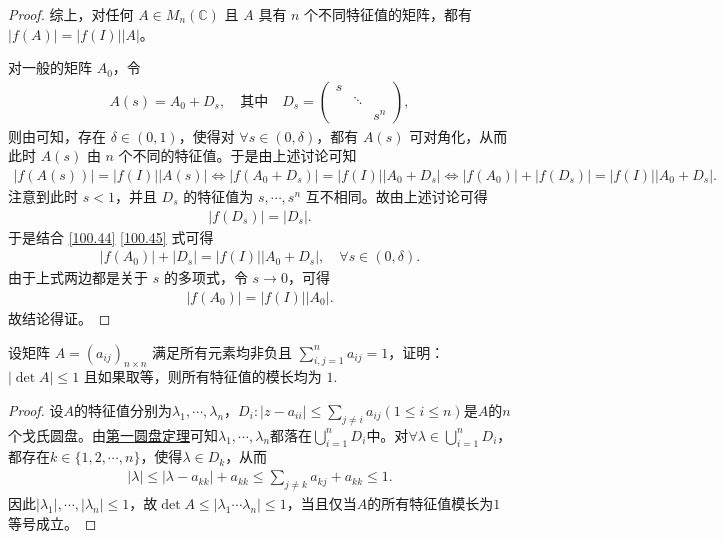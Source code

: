 \documentclass[../../main.tex]{subfiles}%
\begin{document}
\begin{proof}
综上，对任何 $A \in M_n(\mathbb{C})$ 且 $A$ 具有 $n$ 个不同特征值的矩阵，都有 $|f(A)| = |f(I)| |A|$。

对一般的矩阵 $A_0$，令
\begin{align*}
A(s) = A_0 + D_s, \quad \text{其中} \quad D_s = \begin{pmatrix}
s & & \\
& \ddots & \\
& & s^n
\end{pmatrix},
\end{align*}
则由可知，存在 $\delta \in (0, 1)$，使得对 $\forall s \in (0, \delta)$，都有 $A(s)$ 可对角化，从而此时 $A(s)$ 由 $n$ 个不同的特征值。于是由上述讨论可知
\begin{align}
|f(A(s))| = |f(I)| |A(s)| \Longleftrightarrow |f(A_0 + D_s)| = |f(I)| |A_0 + D_s| \Longleftrightarrow |f(A_0)| + |f(D_s)| = |f(I)| |A_0 + D_s|. \label{100.44}
\end{align}
注意到此时 $s < 1$，并且 $D_s$ 的特征值为 $s, \cdots, s^n$ 互不相同。故由上述讨论可得
\begin{align}
|f(D_s)| = |D_s|. \label{100.45}
\end{align}
于是结合 \eqref{100.44} \eqref{100.45} 式可得
\begin{align*}
|f(A_0)| + |D_s| = |f(I)| |A_0 + D_s|, \quad \forall s \in (0, \delta).
\end{align*}
由于上式两边都是关于 $s$ 的多项式，令 $s \rightarrow 0$，可得
\begin{align*}
|f(A_0)| = |f(I)| |A_0|.
\end{align*}
故结论得证。

\end{proof}

\begin{example}
设矩阵 $A = (a_{ij})_{n\times n}$ 满足所有元素均非负且 $\sum_{i,j = 1}^{n} a_{ij} = 1$，证明：$|\det A| \leqslant  1$ 且如果取等，则所有特征值的模长均为 $1$. 
\end{example}
\begin{proof}

设$A$的特征值分别为$\lambda_1,\cdots,\lambda_n$，$D_i:|z-a_{ii}|\leqslant \sum_{j\ne i}a_{ij}(1\leqslant i\leqslant n)$是$A$的$n$个戈氏圆盘。由\hyperref[theorem:第一圆盘定理]{第一圆盘定理}可知$\lambda_1,\cdots,\lambda_n$都落在$\bigcup_{i=1}^n D_i$中。对$\forall \lambda \in \bigcup_{i=1}^n D_i$，都存在$k\in \{1,2,\cdots,n\}$，使得$\lambda \in D_k$，从而
\begin{align*}
|\lambda|\leqslant |\lambda -a_{kk}|+a_{kk}\leqslant \sum_{j\ne k}a_{kj}+a_{kk}\leqslant 1.
\end{align*}
因此$|\lambda_1|,\cdots,|\lambda_n|\leqslant 1$，故$\det A\leqslant |\lambda_1\cdots \lambda_n|\leqslant 1$，当且仅当$A$的所有特征值模长为$1$等号成立。

\end{proof}
\end{document}
